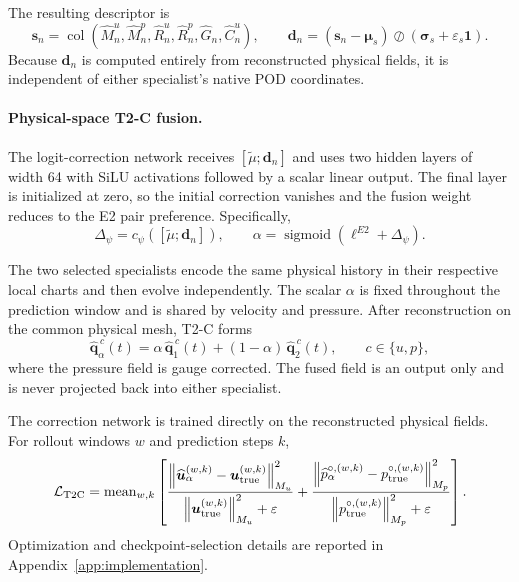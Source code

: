 \documentclass{article}
\begin{document}
The resulting descriptor is
\begin{equation}
  \bm s_n
  =
  \operatorname{col}
  \left(
    \widehat M_n^u,
    \widehat M_n^p,
    \widehat R_n^u,
    \widehat R_n^p,
    \widehat G_n,
    \widehat C_n^u
  \right),
  \qquad
  \bm d_n
  =
  (\bm s_n-\bm\mu_s)
  \oslash
  (\bm\sigma_s+\varepsilon_s\bm 1).
  \label{eq:app_t2c_descriptor}
\end{equation}
Because $\bm d_n$ is computed entirely from reconstructed physical fields,
it is independent of either specialist's native POD coordinates.


\paragraph{Physical-space T2-C fusion.}
The logit-correction network receives
$[\widetilde\mu;\bm d_n]$ and uses two hidden layers of width 64 with SiLU
activations followed by a scalar linear output.
The final layer is initialized at zero, so the initial correction vanishes
and the fusion weight reduces to the E2 pair preference.
Specifically,
\begin{equation}
  \Delta_\psi
  =
  c_\psi
  \left(
    [\widetilde\mu;\bm d_n]
  \right),
  \qquad
  \alpha
  =
  \operatorname{sigmoid}
  \left(
    \ell^{E2}+\Delta_\psi
  \right).
  \label{eq:app_t2c_gate}
\end{equation}

The two selected specialists encode the same physical history in their
respective local charts and then evolve independently.
The scalar $\alpha$ is fixed throughout the prediction window and is shared
by velocity and pressure.
After reconstruction on the common physical mesh, T2-C forms
\begin{equation}
  \widehat{\bm q}_{\alpha}^{\,c}(t)
  =
  \alpha\,
  \widehat{\bm q}_{1}^{\,c}(t)
  +
  (1-\alpha)\,
  \widehat{\bm q}_{2}^{\,c}(t),
  \qquad
  c\in\{u,p\},
  \label{eq:app_t2c_field_fusion}
\end{equation}
where the pressure field is gauge corrected.
The fused field is an output only and is never projected back into either
specialist.

The correction network is trained directly on the reconstructed physical
fields. For rollout windows $w$ and prediction steps $k$,
\begin{equation}
  \mathcal L_{\rm T2C}
  =
  \operatorname{mean}_{w,k}
  \left[
    \frac{
      \left\|
        \widehat{\bm u}_{\alpha}^{(w,k)}
        -
        \bm u_{\rm true}^{(w,k)}
      \right\|_{M_u}^2
    }{
      \left\|
        \bm u_{\rm true}^{(w,k)}
      \right\|_{M_u}^2+\varepsilon
    }
    +
    \frac{
      \left\|
        \widehat p_{\alpha}^{\circ,(w,k)}
        -
        p_{\rm true}^{\circ,(w,k)}
      \right\|_{M_p}^2
    }{
      \left\|
        p_{\rm true}^{\circ,(w,k)}
      \right\|_{M_p}^2+\varepsilon
    }
  \right].
  \label{eq:app_t2c_loss}
\end{equation}
Optimization and checkpoint-selection details are reported in
Appendix~\ref{app:implementation}.
\end{document}
